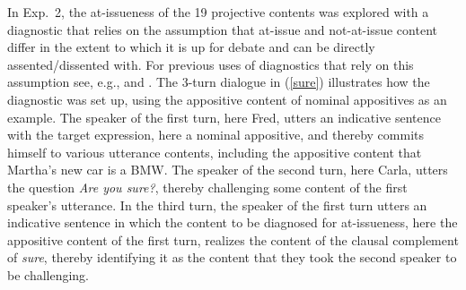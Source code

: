 \documentclass[11pt,fleqn]{article}
\newcommand{\6}{\mbox{$[\hspace*{-.6mm}[$}}
\newcommand{\9}{\mbox{$]\hspace*{-.6mm}]$}}
\begin{document}
In Exp.~2, the at-issueness of the 19 projective contents was explored with a diagnostic that relies on the assumption that at-issue and not-at-issue content differ in the extent to which it is up for debate and can be directly assented/dissented with. For previous uses of diagnostics that rely on this assumption see, e.g., \citealt{amaral-etal07,xue-onea11,murray2014,anderbois-etal2015,destruel-etal2015,tonhauser-sula6} and \citealt{syrett-koev2015}. The 3-turn dialogue in (\ref{sure}) illustrates how the diagnostic was set up, using the appositive content of nominal appositives as an example. The speaker of the first turn, here Fred, utters an indicative sentence with the target expression, here a nominal appositive, and thereby commits himself to various utterance contents, including the appositive content that Martha's new car is a BMW. The speaker of the second turn, here Carla, utters the question {\em Are you sure?}, thereby challenging some content of the first speaker's utterance. In the third turn, the speaker of the first turn utters an indicative sentence in which the content to be diagnosed for at-issueness, here the appositive content of the first turn, realizes the content of the clausal complement of {\em sure}, thereby identifying it as the content that they took the second speaker to be challenging. 
\end{document}
